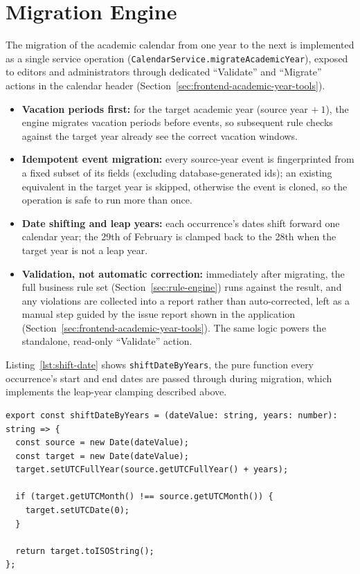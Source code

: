 \section{Migration Engine} \label{sec:migration-engine}

The migration of the academic calendar from one year to the next is implemented as a single service operation (\texttt{CalendarService.migrateAcademicYear}), exposed to editors and administrators through dedicated ``Validate'' and ``Migrate'' actions in the calendar header (Section~\ref{sec:frontend-academic-year-tools}).

\begin{itemize}
    \item \textbf{Vacation periods first:} for the target academic year (source year $+\ 1$), the engine migrates vacation periods before events, so subsequent rule checks against the target year already see the correct vacation windows.
    \item \textbf{Idempotent event migration:} every source-year event is fingerprinted from a fixed subset of its fields (excluding database-generated ids); an existing equivalent in the target year is skipped, otherwise the event is cloned, so the operation is safe to run more than once.
    \item \textbf{Date shifting and leap years:} each occurrence's dates shift forward one calendar year; the 29th of February is clamped back to the 28th when the target year is not a leap year.
    \item \textbf{Validation, not automatic correction:} immediately after migrating, the full business rule set (Section~\ref{sec:rule-engine}) runs against the result, and any violations are collected into a report rather than auto-corrected, left as a manual step guided by the issue report shown in the application (Section~\ref{sec:frontend-academic-year-tools}). The same logic powers the standalone, read-only ``Validate'' action.
\end{itemize}

Listing~\ref{lst:shift-date} shows \texttt{shiftDateByYears}, the pure function every occurrence's start and end dates are passed through during migration, which implements the leap-year clamping described above.

\noindent\begin{minipage}{\linewidth}
\begin{lstlisting}[caption={[Date shifting with leap-year clamping.]{Date shifting with leap-year clamping (\texttt{shared/calendar/academic-year.ts}).}}, label={lst:shift-date}]
export const shiftDateByYears = (dateValue: string, years: number): string => {
  const source = new Date(dateValue);
  const target = new Date(dateValue);
  target.setUTCFullYear(source.getUTCFullYear() + years);

  if (target.getUTCMonth() !== source.getUTCMonth()) {
    target.setUTCDate(0);
  }

  return target.toISOString();
};
\end{lstlisting}
\end{minipage}

